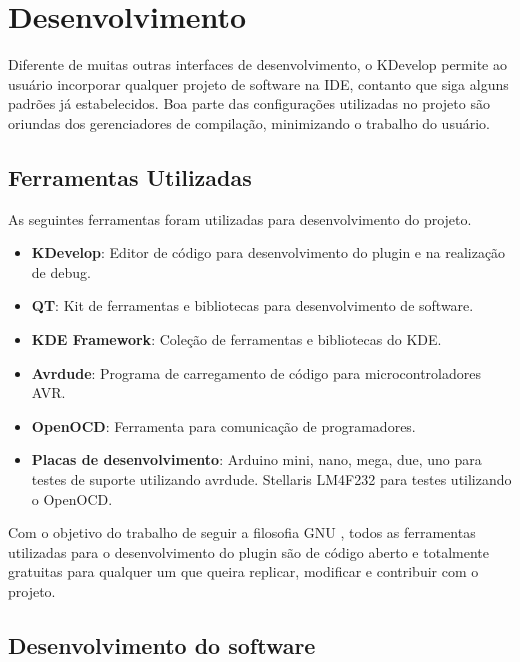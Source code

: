 \chapter{Desenvolvimento}

Diferente de muitas outras interfaces de desenvolvimento, o KDevelop permite ao usuário incorporar qualquer projeto de software na IDE, contanto que siga alguns padrões já estabelecidos. Boa parte das configurações utilizadas no projeto são oriundas dos gerenciadores de compilação, minimizando o trabalho do usuário.

\section{Ferramentas Utilizadas}
As seguintes ferramentas foram utilizadas para desenvolvimento do projeto.
\begin{itemize}
 \item \textbf{KDevelop}: Editor de código para desenvolvimento do plugin e na realização de debug.
 \item \textbf{QT}: Kit de ferramentas e bibliotecas para desenvolvimento de software.
 \item \textbf{KDE Framework}: Coleção de ferramentas e bibliotecas do KDE.
 \item \textbf{Avrdude}: Programa de carregamento de código para microcontroladores AVR.
 \item \textbf{OpenOCD}: Ferramenta para comunicação de programadores.
 \item \textbf{Placas de desenvolvimento}: Arduino mini, nano, mega, due, uno para testes de suporte utilizando avrdude. Stellaris LM4F232 para testes utilizando o OpenOCD.
\end{itemize}

Com o objetivo do trabalho de seguir a filosofia GNU \cite{filosofia}, todos as ferramentas utilizadas para o desenvolvimento do plugin são de código aberto e totalmente gratuitas para qualquer um que queira replicar, modificar e contribuir com o projeto.

\section{Desenvolvimento do software}

